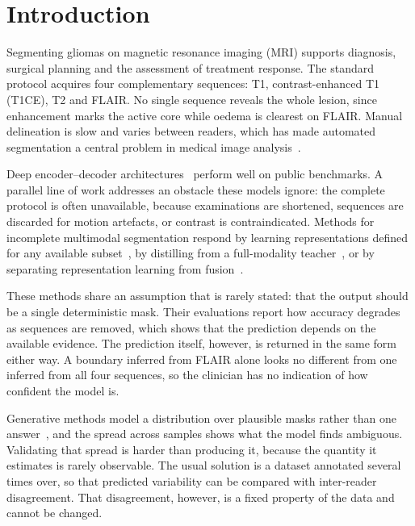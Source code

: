 %
%

\section{Introduction}
\label{sec:intro}

Segmenting gliomas on magnetic resonance imaging (MRI) supports diagnosis,
surgical planning and the assessment of treatment response. The standard
protocol acquires four complementary sequences: T1, contrast-enhanced T1
(T1CE), T2 and FLAIR. No single sequence reveals the whole lesion, since
enhancement marks the active core while oedema is clearest on FLAIR. Manual
delineation is slow and varies between readers, which has made automated
segmentation a central problem in medical image analysis~\cite{brats_menze}.

Deep encoder--decoder architectures~\cite{unet,unet++,nnunet} perform well on
public benchmarks. A parallel line of work addresses an obstacle these models
ignore: the complete protocol is often unavailable, because examinations are
shortened, sequences are discarded for motion artefacts, or contrast is
contraindicated. Methods for incomplete multimodal segmentation respond by
learning representations defined for any available subset~\cite{hemis,rfnet},
by distilling from a full-modality teacher~\cite{mmformer}, or by separating
representation learning from fusion~\cite{unime}.

These methods share an assumption that is rarely stated: that the output
should be a single deterministic mask. Their evaluations report how accuracy
degrades as sequences are removed, which shows that the prediction depends on
the available evidence. The prediction itself, however, is returned in the
same form either way. A boundary inferred from FLAIR alone looks no different
from one inferred from all four sequences, so the clinician has no indication
of how confident the model is.

Generative methods model a distribution over plausible masks rather than one
answer~\cite{probunet,phiseg,medsegdiff}, and the spread across samples shows
what the model finds ambiguous. Validating that spread is harder than
producing it, because the quantity it estimates is rarely observable. The
usual solution is a dataset annotated several times over, so that predicted
variability can be compared with inter-reader disagreement. That disagreement,
however, is a fixed property of the data and cannot be changed.

